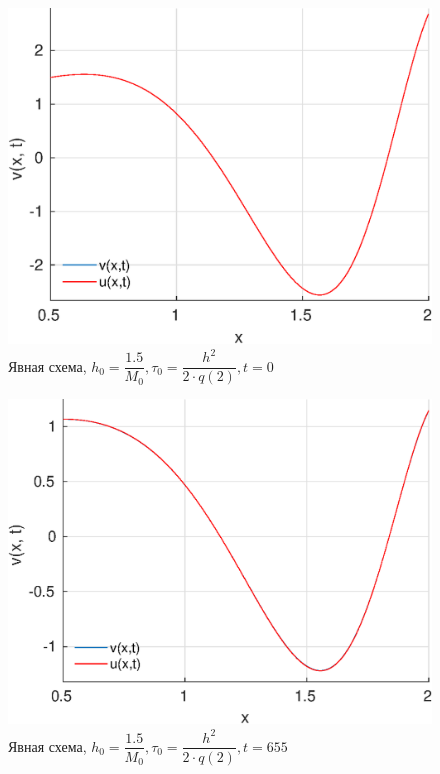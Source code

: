 \documentclass[12pt]{article}
\begin{document}
\begin{enumerate}
\begin{figure}[H]
\centerline{\includegraphics[scale = 0.7]{exp_t=1.eps}}
\caption{Явная схема, $h_0 = \dfrac{1.5}{M_0}, \tau_0 = \dfrac{h^2}{2 \cdot q(2)}, t = 0$}
\end{figure} 

\begin{figure}[H]
\centerline{\includegraphics[scale = 0.7]{exp_t=655.eps}}
\caption{Явная схема, $h_0 = \dfrac{1.5}{M_0}, \tau_0 = \dfrac{h^2}{2 \cdot q(2)}, t = 655$}
\end{figure} 


\end{enumerate}
\end{document}
